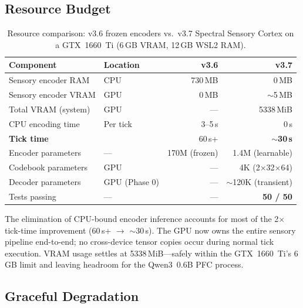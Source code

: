 \subsection{Resource Budget}
\label{sec:v37_resources}

\begin{table}[h]
\centering
\caption{Resource comparison: v3.6 frozen encoders vs.\ v3.7 Spectral Sensory Cortex
         on a GTX~1660~Ti (6\,GB VRAM, 12\,GB WSL2 RAM).}
\label{tab:v37_resources}
\small
\begin{tabularx}{\columnwidth}{lXrr}
\toprule
\textbf{Component} & \textbf{Location} & \textbf{v3.6} & \textbf{v3.7} \\
\midrule
Sensory encoder RAM  & CPU               & 730\,MB  & 0\,MB \\
Sensory encoder VRAM & GPU               & 0\,MB    & $\sim$5\,MB \\
Total VRAM (system)  & GPU               & —        & 5338\,MiB \\
CPU encoding time    & Per tick          & 3--5\,s  & 0\,s \\
\rowcolor{gray!10}
\textbf{Tick time}   &                   & 60\,s+  & \textbf{$\sim$30\,s} \\
\midrule
Encoder parameters   & —                 & 170M (frozen) & 1.4M (learnable) \\
Codebook parameters  & GPU               & —        & 4K (2$\times$32$\times$64) \\
Decoder parameters   & GPU (Phase 0)     & —        & $\sim$120K (transient) \\
\midrule
Tests passing        & —                 & —        & \textbf{50 / 50} \\
\bottomrule
\end{tabularx}
\end{table}

The elimination of CPU-bound encoder inference accounts for most of the 2$\times$
tick-time improvement (60\,s+ $\to$ $\sim$30\,s).
The GPU now owns the entire sensory pipeline end-to-end; no cross-device tensor copies
occur during normal tick execution.
VRAM usage settles at 5338\,MiB---safely within the GTX~1660~Ti's 6\,GB limit and
leaving headroom for the Qwen3~0.6B PFC process.

\subsection{Graceful Degradation}
\label{sec:v37_degradation}

